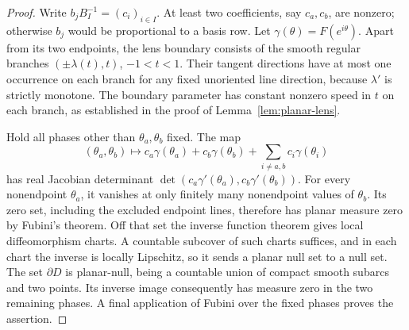 \begin{proof}
Write $b_jB_I^{-1}=(c_i)_{i\in I}$. At least two coefficients, say
$c_a,c_b$, are nonzero; otherwise $b_j$ would be proportional to a basis
row. Let $\gamma(\theta)=F(e^{i\theta})$.
Apart from its two endpoints, the lens boundary consists of the smooth
regular branches $(\pm\lambda(t),t)$, $-1<t<1$.
Their tangent directions have at most one occurrence on each branch for
any fixed unoriented line direction, because $\lambda'$ is strictly
monotone. The boundary parameter has constant nonzero speed in $t$ on
each branch, as established in the proof of Lemma~\ref{lem:planar-lens}.

Hold all phases other than $\theta_a,\theta_b$ fixed. The map
\[
 (\theta_a,\theta_b)\longmapsto
   c_a\gamma(\theta_a)+c_b\gamma(\theta_b)
       +\sum_{i\ne a,b}c_i\gamma(\theta_i)
\]
has real Jacobian determinant
$\det(c_a\gamma'(\theta_a),c_b\gamma'(\theta_b))$.
For every nonendpoint $\theta_a$, it vanishes at only finitely many
nonendpoint values of $\theta_b$. Its zero set, including the excluded
endpoint lines, therefore has planar measure zero by Fubini's theorem.
Off that set the inverse function theorem gives local diffeomorphism
charts. A countable subcover of such charts suffices, and in each chart
the inverse is locally Lipschitz, so it sends a planar null set to a null
set. The set $\partial D$ is planar-null, being a countable union of
compact smooth subarcs and two points. Its inverse image consequently
has measure zero in the two remaining phases. A final application of
Fubini over the fixed phases proves the assertion.
\end{proof}
